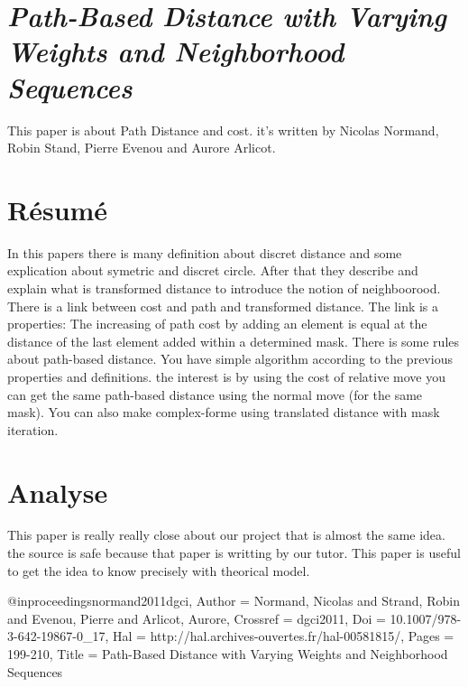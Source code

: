 \documentclass[a4paper,11pt]{report}
\begin{document}
\section{\emph{Path-Based Distance with Varying Weights and Neighborhood Sequences}}

This paper is about Path Distance and cost. it's written by Nicolas Normand, Robin Stand, Pierre Evenou and Aurore Arlicot. 

\section{Résumé}

In this papers there is many definition about discret distance and some explication about symetric and discret circle.
After that they describe and explain what is transformed distance to introduce the notion of neighboorood.
There is a link between cost and path and transformed distance.
The link is a properties: The increasing of path cost by adding an element is equal at the distance of the last element added within a determined mask.
There is some rules about path-based distance.
You have simple algorithm according to the previous properties and definitions.
the interest is by using the cost of relative move you can get the same path-based distance using the normal move (for the same mask).
You can also make complex-forme using translated distance with mask iteration.



\section{Analyse}

This paper is really really close about our project that is almost the same idea. the source is safe because that paper is writting by our tutor. This paper is useful to get the idea to know precisely with theorical model.


@inproceedings{normand2011dgci,
	Author = {Normand, Nicolas and Strand, Robin and Evenou, Pierre and Arlicot, Aurore},
	Crossref = {dgci2011},
	Doi = {10.1007/978-3-642-19867-0\_17},
	Hal = {http://hal.archives-ouvertes.fr/hal-00581815/},
	Pages = {199-210},
	Title = {Path-Based Distance with Varying Weights and Neighborhood Sequences}}
\end{document}
